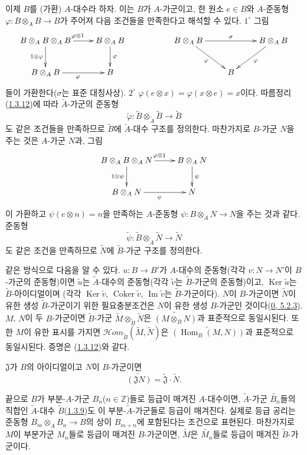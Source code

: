 \begin{env}[1.3.13]
\label{I.1.3.13-ko}
이제 $B$를 (가환) $A$-대수라 하자. 이는 $B$가 $A$-가군이고,
한 원소 $e\in B$와 $A$-준동형
$\varphi:B\otimes_A B\to B$가 주어져 다음 조건들을 만족한다고
해석할 수 있다. $1^\circ$ 그림
\[
  \xymatrix{
    B\otimes_A B\otimes_A B\ar[r]^{\varphi\otimes 1}
      \ar[d]_{1\otimes\varphi} &
    B\otimes_A B\ar[d]^\varphi & &
    B\otimes_A B\ar[rr]^\sigma\ar[rd]_\varphi & &
    B\otimes_A B\ar[dl]^\varphi\\
    B\otimes_A B\ar[r]_\varphi &
    B & & & B
  }
\]
들이 가환한다($\sigma$는 표준 대칭사상). $2^\circ$
$\varphi(e\otimes x)=\varphi(x\otimes e)=x$이다. 따름정리
(\hyperref[I.1.3.12-ko]{1.3.12})에 따라 $\widetilde{A}$-가군의
준동형
\[
  \widetilde{\varphi}:
  \widetilde{B}\otimes_{\widetilde{A}}\widetilde{B}
  \longrightarrow\widetilde{B}
\]
도 같은 조건들을 만족하므로 $\widetilde{B}$에
$\widetilde{A}$-대수 구조를 정의한다. 마찬가지로 $B$-가군 $N$을
주는 것은 $A$-가군 $N$과, 그림
\[
  \xymatrix{
    B\otimes_A B\otimes_A N\ar[r]^{\varphi\otimes 1}
      \ar[d]_{1\otimes\psi} &
    B\otimes_A N\ar[d]^\psi\\
    B\otimes_A N\ar[r]_\psi & N
  }
\]
이 가환하고 $\psi(e\otimes n)=n$을 만족하는 $A$-준동형
$\psi:B\otimes_A N\to N$을 주는 것과 같다. 준동형
\[
  \widetilde{\psi}:
  \widetilde{B}\otimes_{\widetilde{A}}\widetilde{N}
  \longrightarrow\widetilde{N}
\]
도 같은 조건을 만족하므로 $\widetilde{N}$에
$\widetilde{B}$-가군 구조를 정의한다.

같은 방식으로 다음을 알 수 있다. $u:B\to B'$가 $A$-대수의
준동형(각각 $v:N\to N'$이 $B$-가군의 준동형)이면
$\widetilde{u}$는 $\widetilde{A}$-대수의 준동형(각각
$\widetilde{v}$는 $\widetilde{B}$-가군의 준동형)이고,
$\operatorname{Ker}\widetilde{u}$는 $\widetilde{B}$-아이디얼이며
(각각 $\operatorname{Ker}\widetilde{v}$,
$\operatorname{Coker}\widetilde{v}$,
$\operatorname{Im}\widetilde{v}$는 $\widetilde{B}$-가군이다).
$N$이 $B$-가군이면 $\widetilde{N}$이 유한 생성
$\widetilde{B}$-가군이기 위한 필요충분조건은 $N$이 유한 생성
$B$-가군인 것이다(\hyperref[0.5.2.3-ko]{0, 5.2.3}).
$M$, $N$이 두 $B$-가군이면 $\widetilde{B}$-가군
$\widetilde{M}\otimes_{\widetilde{B}}\widetilde{N}$은
$\widetilde{(M\otimes_B N)}$과 표준적으로 동일시된다. 또한 $M$이
유한 표시를 가지면
$\mathscr{H}\!om_{\widetilde{B}}(\widetilde{M},\widetilde{N})$은
$\widetilde{(\operatorname{Hom}_B(M,N))}$과 표준적으로 동일시된다.
증명은 (\hyperref[I.1.3.12-ko]{1.3.12})와 같다.

$\mathfrak{J}$가 $B$의 아이디얼이고 $N$이 $B$-가군이면
\[
  \widetilde{(\mathfrak{J}N)}
  =\widetilde{\mathfrak{J}}\cdot\widetilde{N}.
\]

끝으로 $B$가 부분-$A$-가군 $B_n$($n\in\mathbb{Z}$)들로 등급이
매겨진 $A$-대수이면, $\widetilde{A}$-가군
$\widetilde{B_n}$들의 직합인 $\widetilde{A}$-대수
$\widetilde{B}$(\hyperref[I.1.3.9-ko]{1.3.9})도 이
부분-$\widetilde{A}$-가군들로 등급이 매겨진다. 실제로 등급 공리는
준동형 $B_m\otimes_A B_n\to B$의 상이 $B_{m+n}$에 포함된다는
조건으로 표현된다. 마찬가지로 $M$이 부분가군 $M_n$들로 등급이
매겨진 $B$-가군이면, $\widetilde{M}$은
$\widetilde{M_n}$들로 등급이 매겨진 $\widetilde{B}$-가군이다.
\end{env}

